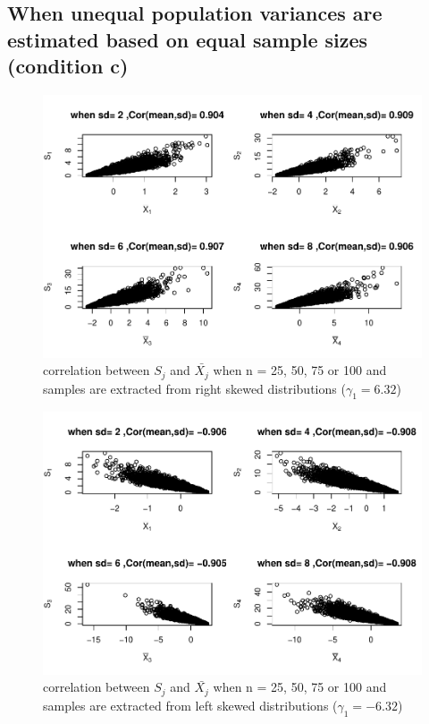 \documentclass[
  man]{apa6}
\begin{document}
\hypertarget{when-unequal-population-variances-are-estimated-based-on-equal-sample-sizes-condition-c}{%
\subsection{When unequal population variances are estimated based on equal sample sizes (condition c)}\label{when-unequal-population-variances-are-estimated-based-on-equal-sample-sizes-condition-c}}

\begin{figure}
\centering
\includegraphics{Correlations-between-the-sample-means-difference-and-standardizers-of-all-estimators,-and-implications-on-biases-and-variances-of-all-estimators_files/figure-latex/C3corn1-1.pdf}
\caption{\label{fig:C3corn1}correlation between \(S_j\) and \(\bar{X_j}\) when n = 25, 50, 75 or 100 and samples are extracted from right skewed distributions (\(\gamma_1 = 6.32\))}
\end{figure}

\begin{figure}
\centering
\includegraphics{Correlations-between-the-sample-means-difference-and-standardizers-of-all-estimators,-and-implications-on-biases-and-variances-of-all-estimators_files/figure-latex/C3corn2-1.pdf}
\caption{\label{fig:C3corn2}correlation between \(S_j\) and \(\bar{X_j}\) when n = 25, 50, 75 or 100 and samples are extracted from left skewed distributions (\(\gamma_1 = -6.32\))}
\end{figure}
\end{document}
